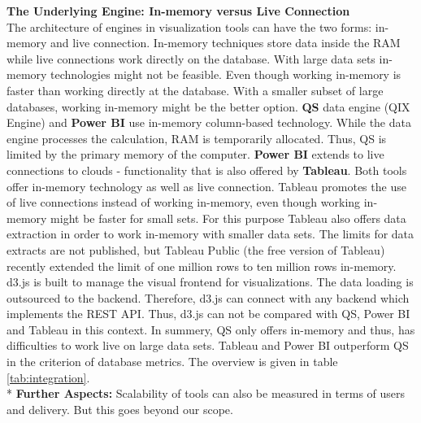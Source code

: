 \textbf{The Underlying Engine: In-memory versus Live Connection}\\
The architecture of engines in visualization tools can have the two forms: in-memory and live connection.
In-memory techniques store data inside the RAM while live connections work directly on the database. 
With large data sets in-memory technologies might not be feasible. Even though working in-memory is faster than working directly at the database. With a smaller subset of large databases, working in-memory might be the better option. 
\textbf{\gls{QS}} data engine  (QIX Engine) and \textbf{Power BI} use in-memory column-based technology. While the data engine processes the calculation, RAM is temporarily allocated. Thus, \gls{QS}   is limited by the primary memory of the computer. \textbf{Power BI} extends to live connections to clouds -  functionality that is also offered by \textbf{Tableau}. Both tools offer in-memory technology as well as live connection. Tableau promotes the use of live connections instead of working in-memory, even though working in-memory might be faster for small sets. For this purpose Tableau also offers data extraction in order to work in-memory with smaller data sets. The limits for data extracts are not published, but Tableau Public (the free version of Tableau) recently extended the limit of one million rows to ten million rows in-memory. 
d3.js is built to manage the visual frontend for visualizations. The data loading is outsourced to the backend. Therefore, d3.js can connect with any backend which implements the REST API. Thus, d3.js can not be compared with QS, Power BI and Tableau in this context. 
In summery, \gls{QS}   only offers in-memory and thus, has difficulties to work live on large data sets. Tableau and Power BI outperform \gls{QS}   in the criterion of database metrics. The overview is given in table \ref{tab:integration}.\\*
\textbf{Further Aspects: }
Scalability of tools can also be measured in terms of users and delivery. But this goes beyond our scope.

